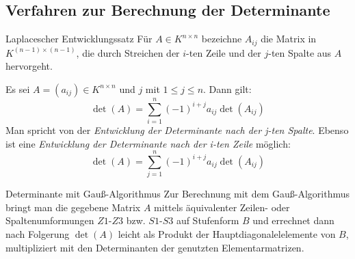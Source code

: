 \documentclass[german]{../spicker}
\begin{document}
\subsection{Verfahren zur Berechnung der Determinante}

\begin{defi}{Laplacescher Entwicklungssatz}
    Für $A \in K^{n\times n}$ bezeichne $A_{ij}$ die Matrix in $K^{(n-1)\times (n-1)}$, die durch Streichen der $i$-ten Zeile und der $j$-ten Spalte aus $A$ hervorgeht.

    Es sei $A = (a_{ij}) \in K^{n\times n}$ und $j$ mit $1 \leq j \leq n$.
    Dann gilt:
    $$
        \det(A) = \sum^n_{i=1} (-1)^{i+j} a_{ij}\det(A_{ij})
    $$
    Man spricht von der \emph{Entwicklung der Determinante nach der j-ten Spalte}.
    Ebenso ist eine \emph{Entwicklung der Determinante nach der i-ten Zeile} möglich:
    $$
        \det(A) = \sum^n_{j=1} (-1)^{i+j} a_{ij}\det(A_{ij})
    $$
\end{defi}

\begin{defi}{Determinante mit Gauß-Algorithmus}
    Zur Berechnung mit dem Gauß-Algorithmus bringt man die gegebene Matrix $A$ mittels äquivalenter Zeilen- oder Spaltenumformungen $Z1$-$Z3$ bzw. $S1$-$S3$ auf Stufenform $B$ und errechnet dann nach Folgerung $\det(A)$ leicht als Produkt der Hauptdiagonalelelemente von $B$, multipliziert mit den Determinanten der genutzten Elementarmatrizen.
\end{defi}
\end{document}
